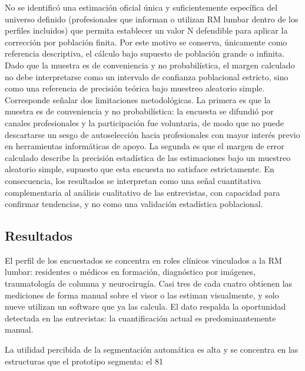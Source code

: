 No se identificó una estimación oficial única y suficientemente específica del universo definido (profesionales que informan o utilizan RM lumbar dentro de los perfiles incluidos) que permita establecer un valor N defendible para aplicar la corrección por población finita. Por este motivo se conserva, únicamente como referencia descriptiva, el cálculo bajo supuesto de población grande o infinita. Dado que la muestra es de conveniencia y no probabilística, el margen calculado no debe interpretarse como un intervalo de confianza poblacional estricto, sino como una referencia de precisión teórica bajo muestreo aleatorio simple. Corresponde señalar dos limitaciones metodológicas. La primera es que la muestra es de conveniencia y no probabilística: la encuesta se difundió por canales profesionales y la participación fue voluntaria, de modo que no puede descartarse un sesgo de autoselección hacia profesionales con mayor interés previo en herramientas informáticas de apoyo. La segunda es que el margen de error calculado describe la precisión estadística de las estimaciones bajo un muestreo aleatorio simple, supuesto que esta encuesta no satisface estrictamente. En consecuencia, los resultados se interpretan como una señal cuantitativa complementaria al análisis cualitativo de las entrevistas, con capacidad para confirmar tendencias, y no como una validación estadística poblacional.

\subsection{Resultados}

El perfil de los encuestados se concentra en roles clínicos vinculados a la RM lumbar: residentes o médicos en formación, diagnóstico por imágenes, traumatología de columna y neurocirugía. Casi tres de cada cuatro obtienen las mediciones de forma manual sobre el visor o las estiman visualmente, y solo nueve utilizan un software que ya las calcula. El dato respalda la oportunidad detectada en las entrevistas: la cuantificación actual es predominantemente manual.


La utilidad percibida de la segmentación automática es alta y se concentra en las estructuras que el prototipo segmenta: el 81 %

